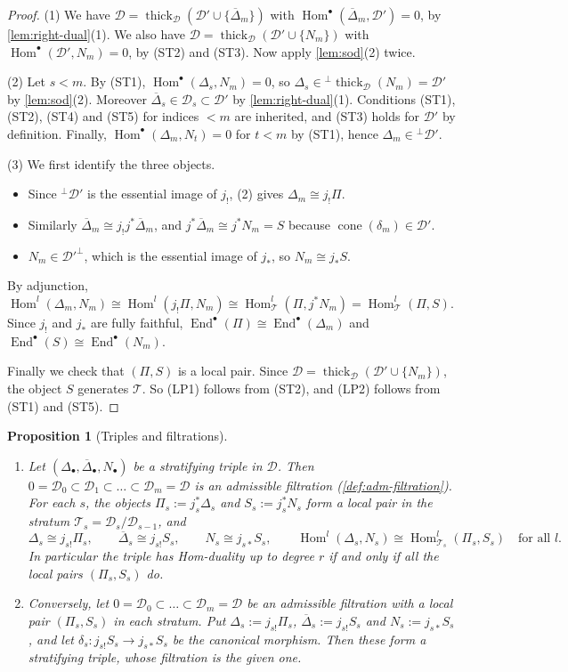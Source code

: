 \documentclass[11pt,reqno]{amsart}
\theoremstyle{plain}
\newtheorem{proposition}[theorem]{Proposition}
\theoremstyle{definition}
\theoremstyle{remark}
\DeclareMathOperator{\Hom}{Hom}
\DeclareMathOperator{\End}{End}
\DeclareMathOperator{\cone}{cone}
\newcommand{\thick}[2][\cD]{\operatorname{thick}_{#1}(#2)}
\newcommand{\Deltabar}{\overline{\Delta}}
\newcommand{\cD}{\mathcal{D}}
\newcommand{\cT}{\mathcal{T}}
\begin{document}
\begin{proof}
(1) We have $\cD=\thick{\cD'\cup\{\Deltabar_m\}}$ with $\Hom^\bullet(\Deltabar_m,\cD')=0$, by \cref{lem:right-dual}(1). We also have $\cD=\thick{\cD'\cup\{N_m\}}$ with $\Hom^\bullet(\cD',N_m)=0$, by (ST2) and (ST3). Now apply \cref{lem:sod}(2) twice.

(2) Let $s<m$. By (ST1), $\Hom^\bullet(\Delta_s,N_m)=0$, so $\Delta_s\in{}^\perp\thick{N_m}=\cD'$ by \cref{lem:sod}(2). Moreover $\Deltabar_s\in\cD_s\subset\cD'$ by \cref{lem:right-dual}(1). Conditions (ST1), (ST2), (ST4) and (ST5) for indices $<m$ are inherited, and (ST3) holds for $\cD'$ by definition. Finally, $\Hom^\bullet(\Delta_m,N_t)=0$ for $t<m$ by (ST1), hence $\Delta_m\in{}^\perp\cD'$.

(3) We first identify the three objects.
\begin{itemize}
\item Since ${}^\perp\cD'$ is the essential image of $j_!$, (2) gives $\Delta_m\cong j_!\Pi$.
\item Similarly $\Deltabar_m\cong j_!j^*\Deltabar_m$, and $j^*\Deltabar_m\cong j^*N_m=S$ because $\cone(\delta_m)\in\cD'$.
\item $N_m\in\cD'^\perp$, which is the essential image of $j_*$, so $N_m\cong j_*S$.
\end{itemize}
By adjunction, $\Hom^l(\Delta_m,N_m)\cong\Hom^l(j_!\Pi,N_m)\cong\Hom^l_\cT(\Pi,j^*N_m)=\Hom^l_\cT(\Pi,S)$. Since $j_!$ and $j_*$ are fully faithful, $\End^\bullet(\Pi)\cong\End^\bullet(\Delta_m)$ and $\End^\bullet(S)\cong\End^\bullet(N_m)$.

Finally we check that $(\Pi,S)$ is a local pair. Since $\cD=\thick{\cD'\cup\{N_m\}}$, the object $S$ generates $\cT$. So (LP1) follows from (ST2), and (LP2) follows from (ST1) and (ST5).
\end{proof}

\begin{proposition}[Triples and filtrations]\label{prop:triple-filtration}
\leavevmode
\begin{enumerate}
\item Let $(\Delta_\bullet,\Deltabar_\bullet,N_\bullet)$ be a stratifying triple in $\cD$. Then $0=\cD_0\subset\cD_1\subset\dots\subset\cD_m=\cD$ is an admissible filtration (\cref{def:adm-filtration}). For each $s$, the objects $\Pi_s:=j_s^*\Delta_s$ and $S_s:=j_s^*N_s$ form a local pair in the stratum $\cT_s=\cD_s/\cD_{s-1}$, and
\[\Delta_s\cong j_{s!}\Pi_s,\qquad\Deltabar_s\cong j_{s!}S_s,\qquad N_s\cong j_{s*}S_s,\qquad\Hom^l(\Delta_s,N_s)\cong\Hom^l_{\cT_s}(\Pi_s,S_s)\quad\text{for all $l$}.\]
In particular the triple has Hom-duality up to degree $r$ if and only if all the local pairs $(\Pi_s,S_s)$ do.
\item Conversely, let $0=\cD_0\subset\dots\subset\cD_m=\cD$ be an admissible filtration with a local pair $(\Pi_s,S_s)$ in each stratum. Put $\Delta_s:=j_{s!}\Pi_s$, $\Deltabar_s:=j_{s!}S_s$ and $N_s:=j_{s*}S_s$, and let $\delta_s\colon j_{s!}S_s\to j_{s*}S_s$ be the canonical morphism. Then these form a stratifying triple, whose filtration is the given one.
\end{enumerate}
\end{proposition}
\end{document}
